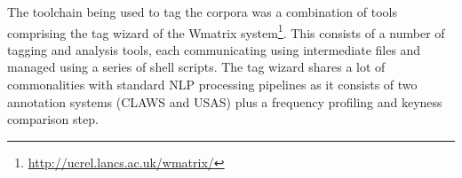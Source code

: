 The toolchain being used to tag the corpora was a combination of tools comprising the tag wizard of the Wmatrix system\footnote{\url{http://ucrel.lancs.ac.uk/wmatrix/}}.  
This consists of a number of tagging and analysis tools, each communicating using intermediate files and managed using a series of shell scripts.  
The tag wizard shares a lot of commonalities with standard NLP processing pipelines as it consists of two annotation systems (CLAWS and USAS) plus a frequency profiling and keyness comparison step.
